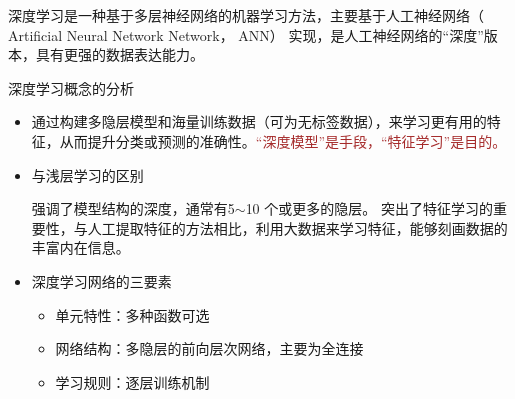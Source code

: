 \begin{definition}[深度学习的概念]
    深度学习是一种基于多层神经网络的机器学习方法，主要基于人工神经网络（ Artificial Neural Network Network， ANN） 实现，是人工神经网络的“深度”版本，具有更强的数据表达能力。
\end{definition}
\begin{note}
    深度学习概念的分析
    \begin{itemize}
        \item 通过构建多隐层模型和海量训练数据（可为无标签数据），来学习更有用的特征，从而提升分类或预测的准确性。\textcolor{brown}{“深度模型”是手段，“特征学习”是目的。}
        \item 与浅层学习的区别
        
        强调了模型结构的深度，通常有5$\sim$10 个或更多的隐层。
        突出了特征学习的重要性，与人工提取特征的方法相比，利用大数据来学习特征，能够刻画数据的丰富内在信息。
        \item 深度学习网络的三要素
        \begin{itemize}
            \item 单元特性：多种函数可选
            \item 网络结构：多隐层的前向层次网络，主要为全连接
            \item 学习规则：逐层训练机制
        \end{itemize}
    \end{itemize}
\end{note}

